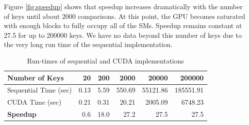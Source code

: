 \documentclass[12pt]{ucthesis}
\begin{document}
Figure \ref{fig:speedup} shows that speedup increases dramatically with 
the number 
of keys until about 2000 comparisons. At this point, the GPU becomes saturated 
with enough blocks to fully occupy all of the SMs. Speedup remains constant at
27.5 for up to 200000 keys. We have no data beyond this number of keys due to 
the very long run time of the sequential implementation. 

%


\begin{table}
   \centering
   \begin{tabular}{|l|*{5}{r}|}\hline
      Number of Keys        & 20   & 200  & 2000   & 20000    & 200000 \\ \hline
      Sequential Time (sec) & 0.13 & 5.59 & 550.69 & 55121.86 & 185551.91\\
      CUDA Time (sec)       & 0.21 & 0.31 & 20.21  & 2005.09  & 6748.23\\\hline
      \textbf{Speedup}      & 0.6  & 18.0 & 27.2   & 27.5     & 27.5\\\hline
   \end{tabular}
   \caption{Run-times of sequential and CUDA implementations\label{tab:runtimes}}
\end{table}
\end{document}
